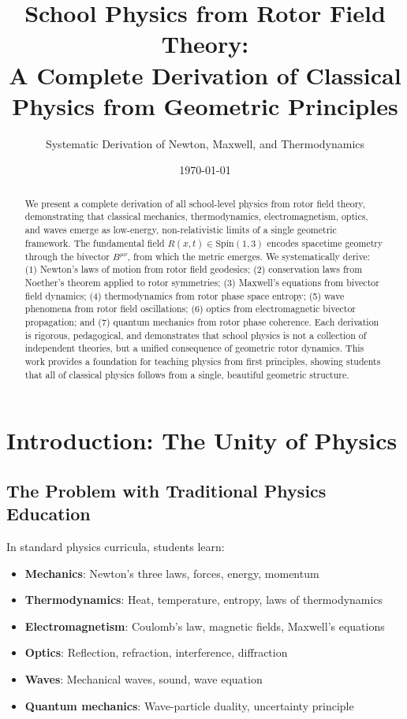 \documentclass[12pt,a4paper]{article}
\title{School Physics from Rotor Field Theory:\\
A Complete Derivation of Classical Physics from Geometric Principles}
\author{Systematic Derivation of Newton, Maxwell, and Thermodynamics}
\date{\today}
\theoremstyle{definition}
\theoremstyle{remark}
\begin{document}
\maketitle

\begin{abstract}
We present a complete derivation of all school-level physics from rotor field theory, demonstrating that classical mechanics, thermodynamics, electromagnetism, optics, and waves emerge as low-energy, non-relativistic limits of a single geometric framework. The fundamental field $R(x,t) \in \mathrm{Spin}(1,3)$ encodes spacetime geometry through the bivector $B^{\mu\nu}$, from which the metric emerges. We systematically derive: (1) Newton's laws of motion from rotor field geodesics; (2) conservation laws from Noether's theorem applied to rotor symmetries; (3) Maxwell's equations from bivector field dynamics; (4) thermodynamics from rotor phase space entropy; (5) wave phenomena from rotor field oscillations; (6) optics from electromagnetic bivector propagation; and (7) quantum mechanics from rotor phase coherence. Each derivation is rigorous, pedagogical, and demonstrates that school physics is not a collection of independent theories, but a unified consequence of geometric rotor dynamics. This work provides a foundation for teaching physics from first principles, showing students that all of classical physics follows from a single, beautiful geometric structure.
\end{abstract}

\tableofcontents
\newpage

\section{Introduction: The Unity of Physics}

\subsection{The Problem with Traditional Physics Education}

In standard physics curricula, students learn:
\begin{itemize}
\item \textbf{Mechanics}: Newton's three laws, forces, energy, momentum
\item \textbf{Thermodynamics}: Heat, temperature, entropy, laws of thermodynamics
\item \textbf{Electromagnetism}: Coulomb's law, magnetic fields, Maxwell's equations
\item \textbf{Optics}: Reflection, refraction, interference, diffraction
\item \textbf{Waves}: Mechanical waves, sound, wave equation
\item \textbf{Quantum mechanics}: Wave-particle duality, uncertainty principle
\end{itemize}
\end{document}
